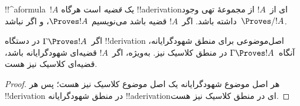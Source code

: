 \documentclass[../../../include/open-logic-section]{subfiles}
\begin{document}
\begin{defn}[قضایا]
!!^a{formula}~$!A$ یک \emph{قضیه} است هرگاه !!a{derivation}ای از~$!A$
از مجموعهٔ تهی وجود داشته باشد. اگر~$!A$ قضیه باشد می‌نویسیم
$\Proves !A$، و اگر نباشد~$\Proves/ !A$.
\end{defn}

\begin{prop}
  اگر~$\Gamma \Proves !A$ در دستگاه !!{derivation} اصل‌موضوعی برای
  منطق شهودگرایانه، آنگاه~$\Gamma \Proves !A$ در منطق کلاسیک نیز.
  به‌ویژه، اگر~$!A$ قضیه‌ای شهودگرایانه باشد، قضیه‌ای کلاسیک نیز هست.
\end{prop}

\begin{proof}
  هر اصل موضوع شهودگرایانه یک اصل موضوع کلاسیک نیز هست؛ پس هر
  !!{derivation} در منطق شهودگرایانه !!a{derivation}ای در منطق کلاسیک
  نیز هست.
\end{proof}
\end{document}

